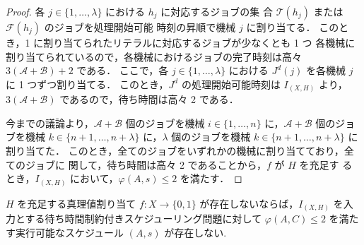\documentclass[12pt]{optlab-bachelor}
\begin{document}
\begin{proof}
  各 $j \in \{1, \ldots, \lambda \}$ における $h_j$ に対応するジョブの集
  合 $\mathcal{T}(h_j)$ または $\mathcal{F}(h_j)$ のジョブを処理開始可能
  時刻の昇順で機械 $j$ に割り当てる．
  このとき，1 に割り当てられたリテラルに対応するジョブが少なくとも 1 つ
  各機械に割り当てられているので，各機械におけるジョブの完了時刻は高々
  $3(\mathcal{A} + \mathcal{B}) + 2$ である．
  ここで，各 $j \in \{1,\ldots,\lambda\}$ における $J^d(j)$ を各機械 $j$
  に 1 つずつ割り当てる．
  このとき，$J^d$ の処理開始可能時刻は $I_{(X,H)}$ より，$3(\mathcal{A}
  + \mathcal{B})$ であるので，待ち時間は高々 2 である．

  今までの議論より，$\mathcal{A} + \mathcal{B}$ 個のジョブを機械 $i \in
  \{1,\ldots,n\}$ に，$\mathcal{A} + \mathcal{B}$ 個のジョブを機械 $k \in\{n + 1, \ldots, n + \lambda\}$ に，$\lambda$ 個のジョブを機械 $k \in\{n + 1, \ldots, n + \lambda\}$ に割り当てた．
  このとき，全てのジョブをいずれかの機械に割り当てており，全てのジョブに
  関して，待ち時間は高々 2 であることから，$f$ が $H$ を充足す
  るとき，$I_{(X,H)}$ において，$\varphi(A,s) \le 2$ を満たす．
\end{proof}

\begin{lemma}\label{l_7}
  $H$ を充足する真理値割り当て $f : X \to \{0,1\}$ が存在しないならば，$I_{(X,H)}$ を入力とする待ち時間制約付きスケジューリング問題に対して $\varphi(A, C) \le 2$ を満たす実行可能なスケジュール $(A,s)$ が存在しない.
\end{lemma}
\end{document}
